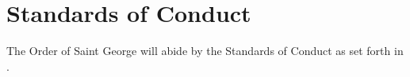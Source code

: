 {
	\section{Standards of Conduct}
	The Order of Saint George will abide by the Standards of Conduct as set forth in \crimson.
}